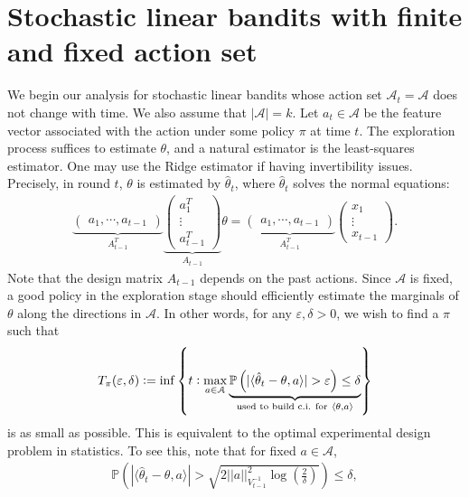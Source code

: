 \documentclass[10pt, openright]{book}
\numberwithin{equation}{section}
\theoremstyle{plain}
\theoremstyle{definition}
\def\P{{\mathbb P}}
\def\e{{\varepsilon}}
\def\t{{\theta}}
\begin{document}
\section{Stochastic linear bandits with finite and fixed action set}

We begin our analysis for stochastic linear bandits whose action set $\mathcal A_t = \mathcal A$ does not change with time. We also assume that $|\mathcal A|=k$. Let $a_t\in\mathcal A$ be the feature vector associated with the action under some policy $\pi$ at time $t$. The exploration process suffices to estimate $\t$, and a natural estimator is the least-squares estimator. One may use the Ridge estimator if having invertibility issues. Precisely, in round $t$, $\t$ is estimated by $\hat{\t}_t$, where $\hat{\t}_t $ solves the normal equations: 
\begin{align*}
\underbrace{\begin{pmatrix}
a_1, \cdots, a_{t-1}
\end{pmatrix}}_{A^T_{t-1}}\underbrace{\begin{pmatrix}
a_1^T \\
\vdots \\
a_{t-1}^T
\end{pmatrix}}_{A_{t-1}}\t = \underbrace{\begin{pmatrix}
a_1, \cdots, a_{t-1}
\end{pmatrix}}_{A^T_{t-1}}\begin{pmatrix}
x_1 \\
\vdots \\
x_{t-1}
\end{pmatrix}.
\end{align*}
Note that the design matrix $A_{t-1}$ depends on the past actions. Since $\mathcal A$ is fixed, a good policy in the exploration stage should efficiently estimate the marginals of $\t$ along the directions in $\mathcal A$. In other words, for any $\e, \delta>0$, we wish to find a $\pi$ such that 
\begin{align}
T_{\pi}(\e, \delta):=\inf\left\{t: \max_{a\in\mathcal A}\underbrace{\P\left(|\langle\hat{\t}_t-\t, a\rangle|>\e\right)\leq\delta}_{\textcolor{black}{\text{used to build c.i. for}\ \langle\t, a\rangle}}\right\}\label{sl:5}
\end{align}
is as small as possible. This is equivalent to the optimal experimental design problem in statistics. 
To see this, note that for fixed $a\in\mathcal A$, 
\begin{align*}
\P\left(|\langle\hat{\t}_t-\t, a\rangle|>\sqrt{2||a||^2_{V_{t-1}^{-1}}\log\left(\frac{2}{\delta}\right)}\right)\leq\delta,
\end{align*}
\end{document}
